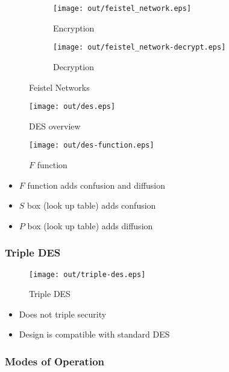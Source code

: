 \documentclass[a4paper]{article}
\begin{document}
\begin{figure}[h]
  \centering
  \begin{subfigure}[t!]{0.4\textwidth}
    \texttt{[image: out/feistel\_network.eps]}
    \caption{Encryption}
    \label{fig:feistel_network}
  \end{subfigure}
  \begin{subfigure}[t!]{0.4\textwidth}
    \texttt{[image: out/feistel\_network-decrypt.eps]}
    \caption{Decryption}
    \label{fig:feistel_network_decrypt}
  \end{subfigure}
  \caption{Feistel Networks}
  \label{fig:feistel_networks}
\end{figure}
\FloatBarrier

\begin{figure}[h!]
  \centering
  \texttt{[image: out/des.eps]}
  \caption{DES overview}
  \label{fig:des}
\end{figure}
\FloatBarrier

\begin{figure}[h!]
  \centering
  \texttt{[image: out/des-function.eps]}
  \caption{$F$ function}
  \label{fig:des-function}
\end{figure}
\FloatBarrier

\begin{itemize}
  \item $F$ function adds confusion and diffusion
  \item $S$ box (look up table) adds confusion
  \item $P$ box (look up table) adds diffusion
\end{itemize}

\subsubsection{Triple DES}

\begin{figure}[h!]
  \centering
  \texttt{[image: out/triple-des.eps]}
  \caption{Triple DES}
  \label{fig:triple-des}
\end{figure}
\FloatBarrier

\begin{itemize}
  \item Does not triple security
  \item Design is compatible with standard DES
\end{itemize}

\subsubsection{Modes of Operation}
\end{document}
